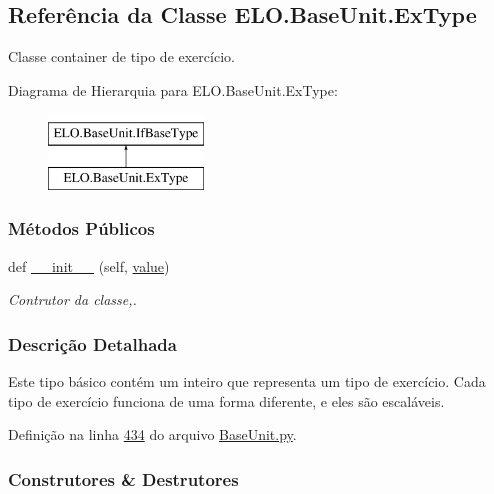 \hypertarget{classELO_1_1BaseUnit_1_1ExType}{}\subsection{Referência da Classe E\+L\+O.\+Base\+Unit.\+Ex\+Type}
\label{classELO_1_1BaseUnit_1_1ExType}


Classe container de tipo de exercício.  


Diagrama de Hierarquia para E\+L\+O.\+Base\+Unit.\+Ex\+Type\+:\begin{figure}[H]
\begin{center}
\leavevmode
\includegraphics[height=2.000000cm]{de/d96/classELO_1_1BaseUnit_1_1ExType}
\end{center}
\end{figure}
\subsubsection*{Métodos Públicos}
\begin{DoxyCompactItemize}
\item 
def \hyperlink{classELO_1_1BaseUnit_1_1ExType_ae1e5e0b555574e9f8514c0571720ae83}{\+\_\+\+\_\+init\+\_\+\+\_\+} (self, \hyperlink{classELO_1_1BaseUnit_1_1IfBaseType_a2534c3548a8e5991dde0a64b4f0b542b}{value})
\begin{DoxyCompactList}\small\item\em Contrutor da classe,. \end{DoxyCompactList}\end{DoxyCompactItemize}


\subsubsection{Descrição Detalhada}
Este tipo básico contém um inteiro que representa um tipo de exercício. Cada tipo de exercício funciona de uma forma diferente, e eles são escaláveis. 

Definição na linha \hyperlink{BaseUnit_8py_source_l00434}{434} do arquivo \hyperlink{BaseUnit_8py_source}{Base\+Unit.\+py}.



\subsubsection{Construtores \& Destrutores}
\hypertarget{classELO_1_1BaseUnit_1_1ExType_ae1e5e0b555574e9f8514c0571720ae83}{}

